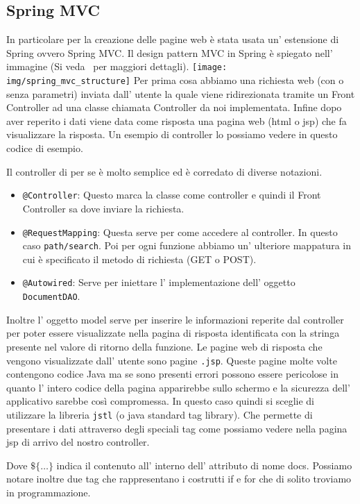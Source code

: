 \documentclass[12pt]{book}
\begin{document}
\subsection{Spring MVC}
In particolare per la creazione delle pagine web è stata usata un' estensione
di Spring ovvero Spring MVC\@.
Il design pattern MVC in Spring è spiegato nell' immagine
(Si veda~\cite{apress:introducing_spring_framework} per maggiori dettagli).
\newline
\newline
\texttt{[image: img/spring\_mvc\_structure]}
\newline
Per prima cosa abbiamo una richiesta web (con o senza parametri) inviata dall' 
utente la quale viene ridirezionata tramite un Front Controller ad una classe 
chiamata Controller da noi implementata.
Infine dopo aver reperito i dati viene data come risposta una pagina web (html 
o jsp) che fa visualizzare la risposta.
Un esempio di controller lo possiamo vedere in questo codice di esempio.

Il controller di per se è molto semplice ed è corredato di diverse notazioni.
\begin{itemize}
    \item \texttt{@Controller}: Questo marca la classe come controller e quindi
        il Front Controller sa dove inviare la richiesta.
    \item \texttt{@RequestMapping}: Questa serve per come accedere al controller.
        In questo caso \texttt{path/search}. Poi per ogni funzione abbiamo un'
        ulteriore mappatura in cui è specificato il metodo di richiesta (GET o
        POST). 
    \item \texttt{@Autowired}: Serve per iniettare l' implementazione dell' 
        oggetto \texttt{DocumentDAO}.
\end{itemize}
Inoltre l' oggetto model serve per inserire le informazioni reperite dal 
controller per poter essere visualizzate nella pagina di risposta identificata
con la stringa presente nel valore di ritorno della funzione.
Le pagine web di risposta che vengono visualizzate dall' utente sono pagine 
\texttt{.jsp}. Queste pagine molte volte contengono codice Java ma se sono 
presenti errori possono essere pericolose in quanto l' intero codice della 
pagina apparirebbe sullo schermo e la sicurezza dell' applicativo sarebbe così
compromessa.
In questo caso quindi si sceglie di utilizzare la libreria \texttt{jstl} (o java
standard tag library). Che permette di presentare i dati attraverso degli 
speciali tag come possiamo vedere nella pagina jsp di arrivo del nostro 
controller.

Dove \texttt{\(\$\{\dots\}\)} indica il contenuto all' interno dell' attributo
di nome docs.
Possiamo notare inoltre due tag che rappresentano i costrutti if e for che di
solito troviamo in programmazione.
\end{document}
